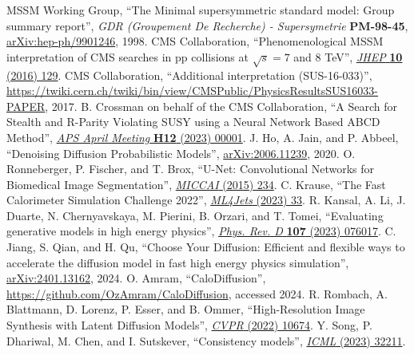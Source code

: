 \begin{thebibliography}{99}
 MSSM Working Group, ``The Minimal supersymmetric standard model: Group summary report'', \textit{GDR (Groupement De Recherche) - Supersymetrie} \textbf{PM-98-45}, \href{https://arxiv.org/abs/hep-ph/9901246}{arXiv:hep-ph/9901246}, 1998.
 CMS Collaboration, ``Phenomenological MSSM interpretation of CMS searches in pp collisions at $\sqrt{s} = 7$ and 8 TeV'', \href{https://doi.org/10.1007/JHEP10(2016)129}{\textit{JHEP} \textbf{10} (2016) 129}.
 CMS Collaboration, ``Additional interpretation (SUS-16-033)'', \href{https://twiki.cern.ch/twiki/bin/view/CMSPublic/PhysicsResultsSUS16033-PAPER}{https://twiki.cern.ch/twiki/bin/view/CMSPublic/PhysicsResultsSUS16033-PAPER}, 2017.
 B. Crossman on behalf of the CMS Collaboration, ``A Search for Stealth and R-Parity Violating SUSY using a Neural Network Based ABCD Method'', \href{https://meetings.aps.org/Meeting/APR23/Session/H12.1}{\textit{APS April Meeting} \textbf{H12} (2023) 00001}.
 J. Ho, A. Jain, and P. Abbeel, ``Denoising Diffusion Probabilistic Models'', \href{https://arxiv.org/abs/2006.11239}{arXiv:2006.11239}, 2020.
 O. Ronneberger, P. Fischer, and T. Brox, ``U-Net: Convolutional Networks for Biomedical Image Segmentation'', \href{https://doi.org/10.1007/978-3-319-24574-4_28}{\textit{MICCAI} (2015) 234}.
 C. Krause, ``The Fast Calorimeter Simulation Challenge 2022'', \href{https://indico.cern.ch/event/1253794/contributions/5588599/}{\textit{ML4Jets} (2023) 33}.
 R. Kansal, A. Li, J. Duarte, N. Chernyavskaya, M. Pierini, B. Orzari, and T. Tomei, ``Evaluating generative models in high energy physics'', \href{https://doi.org/10.1103/PhysRevD.107.076017}{\textit{Phys. Rev. D} \textbf{107} (2023) 076017}.
 C. Jiang, S. Qian, and H. Qu, ``Choose Your Diffusion: Efficient and flexible ways to accelerate the diffusion model in fast high energy physics simulation'', \href{https://arxiv.org/abs/2401.13162}{arXiv:2401.13162}, 2024.
 O. Amram, ``CaloDiffusion'', \href{https://github.com/OzAmram/CaloDiffusion}{https://github.com/OzAmram/CaloDiffusion}, accessed 2024.
 R. Rombach, A. Blattmann, D. Lorenz, P. Esser, and B. Ommer, ``High-Resolution Image Synthesis with Latent Diffusion Models'', \href{https://doi.ieeecomputersociety.org/10.1109/CVPR52688.2022.01042}{\textit{CVPR} (2022) 10674}.
 Y. Song, P. Dhariwal, M. Chen, and I. Sutskever, ``Consistency models'', \href{https://dl.acm.org/doi/10.5555/3618408.3619743}{\textit{ICML} (2023) 32211}.

\end{thebibliography}
